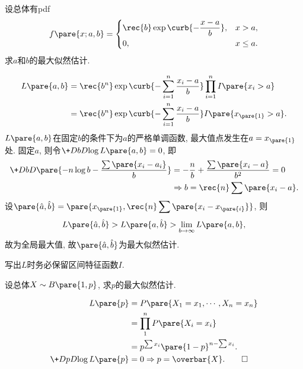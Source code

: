 \documentclass[../Statistics.tex]{subfiles}
\begin{document}
\begin{sample}
    \begin{ex}
        设总体有pdf
        \[ f\pare{x;a,b} = \left\{\begin{aligned}
            &\rec{b} \exp\curb{- \frac{x-a}{b}}, & x>a, \\
            &0, & x \le a.
        \end{aligned}\right. \]
        求$a$和$b$的最大似然估计.
    \end{ex}
    \begin{solution}
        \begin{align*}
            L\pare{a,b} &= \displaystyle \rec{b^n} \exp\curb{-\sum_{i=1}^n \frac{x_i-a}{b}}\prod_{i=1}^n I\pare{x_i > a} \\
            &= \rec{b^n}  \exp\curb{-\sum_{i=1}^n \frac{x_i-a}{b}} I\pare{x_{\pare{1}} > a}.
        \end{align*}
        $L\pare{a,b}$在固定$b$的条件下为$a$的严格单调函数, 最大值点发生在$a = x_{\pare{1}}$处. 固定$a$, 则令$\displaystyle \+DbD{\log L\pare{a,b}} = 0$, 即
        \begin{align*}
            \+DbD{} \pare{-n\log b - \frac{\sum \pare{x_i - a_i}}{b}} &= -\frac{n}{b} + \frac{\sum\pare{x_i - a}}{b^2} = 0 \\&\Rightarrow b = \rec{n}\sum\pare{x_i - a}.
        \end{align*}
        设$\pare{\hat{a},\hat{b}} = \pare{x_{\pare{1}}, \displaystyle \rec{n} \sum\pare{x_i - x_{\pare{i}}}}$, 则
        \[ L\pare{\hat a, \hat b} > L\pare{a,\hat b} > \lim_{b\rightarrow \infty} L\pare{a,b}, \]
        故为全局最大值, 故$\pare{\hat a, \hat b}$为最大似然估计.
    \end{solution}
\end{sample}
\begin{pitfall}
    写出$L$时务必保留区间特征函数$I$.
\end{pitfall}
\begin{sample}
    \begin{ex}
        设总体$X\sim B\pare{1,p}$, 求$p$的最大似然估计.
    \end{ex}
    \begin{solution}
        \begin{align*}
            L\pare{p} &= P\pare{X_1 = x_1,\cdots, X_n = x_n} \\
            &= \prod_1^n P\pare{X_i = x_i} \\
            &= p^{\sum x_i} \pare{1-p}^{n-\sum x_i}.\\
            \+DpD{\log L\pare{p}} &= 0 \Rightarrow p = \overbar{X}. \qedhere
        \end{align*}
    \end{solution}
\end{sample}
\end{document}
